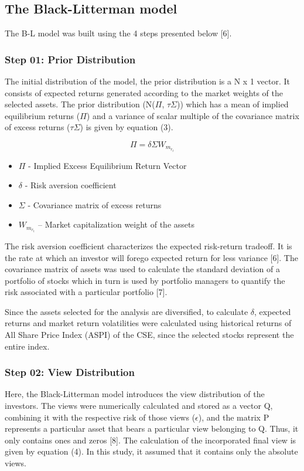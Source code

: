 \documentclass[conference]{IEEEtran}
\begin{document}
\subsection{The Black-Litterman model}

The B-L model was built using the 4 steps presented below [6]. 

\subsubsection{Step 01: Prior Distribution}
The initial distribution of the model, the prior distribution is a N x 1 vector. It consists of expected returns generated according to the market weights of the selected assets. The prior distribution (N($\Pi$, $\tau$$\Sigma$)) which has a mean of implied equilibrium returns ($\Pi$) and a variance of scalar multiple of the covariance matrix of excess returns ($\tau$$\Sigma$) is given by equation (3).

\begin{equation}
{\Pi = \delta\Sigma W_m_r_t}
\end{equation} 

\begin{itemize}
\item $\Pi$ - Implied Excess Equilibrium Return Vector 
\item $\delta$ - Risk aversion coefficient
\item $\Sigma$ - Covariance matrix of excess returns 
\item $W_m_r_t$ – Market capitalization weight of the assets
\end{itemize} \vspace{0.1cm}

The risk aversion coefficient characterizes the expected risk-return tradeoff. It is the rate at which an investor will forego expected return for less variance [6]. The covariance matrix of assets was used to calculate the standard deviation of a portfolio of stocks which in turn is used by portfolio managers to quantify the risk associated with a particular portfolio [7].\vspace{0.1cm}

Since the assets selected for the analysis are diversified, to calculate $\delta$, expected returns and market return volatilities were calculated using historical returns of All Share Price Index (ASPI) of the CSE, since the selected stocks represent the entire index.\vspace{0.1cm}

\subsubsection{Step 02: View Distribution}
Here, the Black-Litterman model introduces the view distribution of the investors.  The views were numerically calculated and stored as a vector Q, combining it with the respective risk of those views ($\epsilon$), and the matrix P represents a particular asset that bears a particular view belonging to Q. Thus, it only contains ones and zeros [8]. The calculation of the incorporated final view is given by equation (4). In this study, it assumed that it contains only the absolute views.
\end{document}
